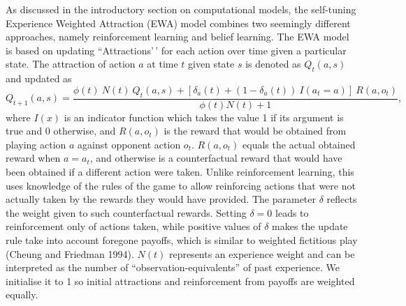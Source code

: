 \documentclass[smallextended]{svjour3}       %
\begin{document}
As discussed in the introductory section on computational models, the
self-tuning Experience Weighted Attraction (EWA) model combines two
seemingly different approaches, namely reinforcement learning and belief
learning. The EWA model is based on updating ``Attractions'\,' for each
action over time given a particular state. The attraction of action
\(a\) at time \(t\) given state \(s\) is denoted as \(Q_{t}(a, s)\) and
updated as
\[ Q_{t+1}(a,s) =  \frac{\phi(t) \ N(t) \ Q_{t}(a,s) + [ \delta_{a}(t) + (1-\delta_{a}(t)) \ I(a_t = a )] \ R(a,o_t) } {\phi(t)N(t) + 1} ,\]
where \(I(x)\) is an indicator function which takes the value 1 if its
argument is true and 0 otherwise, and \(R(a,o_t)\) is the reward that
would be obtained from playing action \(a\) against opponent action
\(o_t\). \(R(a,o_t)\) equals the actual obtained reward when
\(a = a_t\), and otherwise is a counterfactual reward that would have
been obtained if a different action were taken. Unlike reinforcement
learning, this uses knowledge of the rules of the game to allow
reinforcing actions that were not actually taken by the rewards they
would have provided. The parameter \(\delta\) reflects the weight given
to such counterfactual rewards. Setting \(\delta = 0\) leads to
reinforcement only of actions taken, while positive values of \(\delta\)
makes the update rule take into account foregone payoffs, which is
similar to weighted fictitious play (Cheung and Friedman 1994). \(N(t)\)
represents an experience weight and can be interpreted as the number of
``observation-equivalents'' of past experience. We initialise it to 1 so
initial attractions and reinforcement from payoffs are weighted equally.
\end{document}
